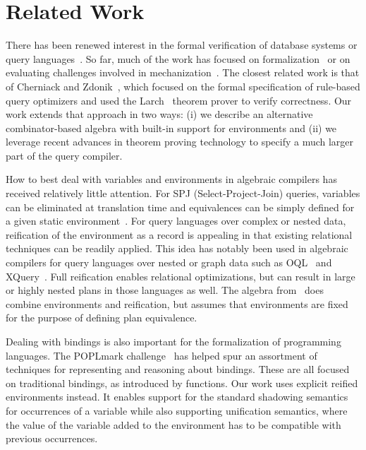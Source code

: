 \section{Related Work}
\label{sec:related}

There has been renewed interest in the formal verification of
database systems or query
languages~\cite{BenzakenCD14,CheneyU11,malecha2015,MalechaMSW10,ShinnarSH15}. So
far, much of the work has focused on
formalization~\cite{BenzakenCD14,CheneyU11,ShinnarSH15} or on
evaluating challenges involved in
mechanization~\cite{MalechaMSW10}. The closest related work is that of
Cherniack and Zdonik~\cite{cherniack1996rule,CherniackZ98}, which
focused on the formal specification of rule-based query optimizers and
used the Larch~\cite{Larch89} theorem prover to verify
correctness. Our work extends that approach in two ways: (i) we
describe an alternative combinator-based algebra with built-in support
for environments and (ii) we leverage recent advances in theorem
proving technology to specify a much larger part of the query
compiler.

How to best deal with variables and environments in algebraic
compilers has received relatively little attention. For SPJ
(Select-Project-Join) queries, variables can be eliminated at
translation time and equivalences can be simply defined for a given
static environment~\cite{aho1979efficient}. For query languages over
complex or nested data, reification of the environment as a record is
appealing in that existing relational techniques can be readily
applied. This idea has notably been used in algebraic compilers for
query languages over nested or graph data such as OQL~\cite{CluetM93}
and XQuery~\cite{MayHM04,re2006complete}. Full reification enables
relational optimizations, but can result in large or highly nested
plans in those languages as well. The algebra from~\cite{CluetM93}
does combine environments and reification, but assumes that
environments are fixed for the purpose of defining plan equivalence.

Dealing with bindings is also important for the formalization of
programming languages. The POPLmark
challenge~\cite{AydemirBFFPSVWWZ05} has helped spur an assortment of
techniques for representing and reasoning about bindings.  These are
all focused on traditional bindings, as introduced by functions.  Our
work uses explicit reified environments instead. It enables support
for the standard shadowing semantics for occurrences of a variable
while also supporting unification semantics, where the value of the
variable added to the environment has to be compatible with 
previous occurrences.


